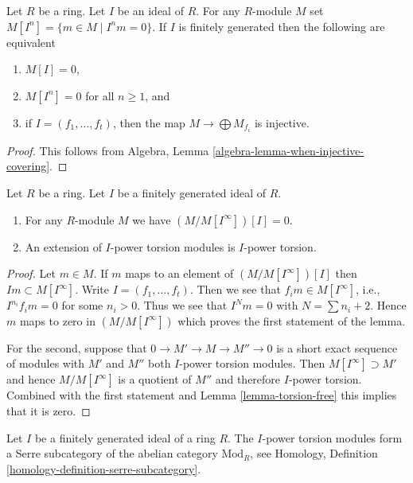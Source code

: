 \begin{lemma}
\label{lemma-torsion-free}
Let $R$ be a ring. Let $I$ be an ideal of $R$.
For any $R$-module $M$ set $M[I^n] = \{m \in M \mid I^nm = 0\}$.
If $I$ is finitely generated then the following are equivalent
\begin{enumerate}
\item $M[I] = 0$,
\item $M[I^n] = 0$ for all $n \geq 1$, and
\item if $I = (f_1, \ldots, f_t)$, then the map
$M \to \bigoplus M_{f_i}$ is injective.
\end{enumerate}
\end{lemma}

\begin{proof}
This follows from
Algebra, Lemma \ref{algebra-lemma-when-injective-covering}.
\end{proof}

\begin{lemma}
\label{lemma-divide-by-torsion}
Let $R$ be a ring. Let $I$ be a finitely generated ideal of $R$.
\begin{enumerate}
\item For any $R$-module $M$ we have $(M/M[I^\infty])[I] = 0$.
\item An extension of $I$-power torsion modules is $I$-power torsion.
\end{enumerate}
\end{lemma}

\begin{proof}
Let $m \in M$. If $m$ maps to an element of $(M/M[I^\infty])[I]$
then $Im \subset M[I^\infty]$.
Write $I = (f_1, \ldots, f_t)$. Then we see that
$f_i m \in M[I^\infty]$, i.e., $I^{n_i}f_i m = 0$ for some $n_i > 0$.
Thus we see that $I^Nm = 0$ with $N = \sum n_i + 2$.
Hence $m$ maps to zero in $(M/M[I^\infty])$ which proves the
first statement of the lemma.

\medskip\noindent
For the second, suppose that $0 \to M' \to M \to M'' \to 0$ is a short
exact sequence of modules with $M'$ and $M''$ both $I$-power torsion
modules. Then $M[I^\infty] \supset M'$ and hence $M/M[I^\infty]$ is a
quotient of $M''$ and therefore $I$-power torsion. Combined with
the first statement and Lemma \ref{lemma-torsion-free} this implies
that it is zero.
\end{proof}

\begin{lemma}
\label{lemma-I-power-torsion}
Let $I$ be a finitely generated ideal of a ring $R$.
The $I$-power torsion modules form a Serre subcategory of
the abelian category $\text{Mod}_R$, see
Homology, Definition \ref{homology-definition-serre-subcategory}.
\end{lemma}


